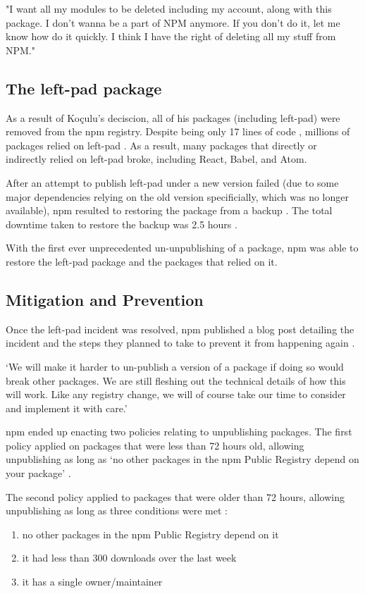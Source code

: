 \documentclass[acmsmall]{acmart}
\begin{document}
"I want all my modules to be deleted including my account, along with this package.
I don't wanna be a part of NPM anymore. If you don't do it, let me know how do it quickly.
I think I have the right of deleting all my stuff from NPM." \cite{medium-mikeroberts}

\subsection{The left-pad package}
As a result of Koçulu's deciscion, all of his packages (including left-pad) were removed
from the npm registry. Despite being only 17 lines of code \cite{github-leftpad-code},
millions of packages relied on left-pad \cite{github-leftpad-dependency}. As a result,
many packages that directly or indirectly relied on left-pad broke, including React,
Babel, and Atom.

After an attempt to publish left-pad under a new version failed (due to some major
dependencies relying on the old version specificially, which was no longer available),
npm resulted to restoring the package from a backup \cite{npmblog-leftpad}. The total
downtime taken to restore the backup was 2.5 hours \cite{npmblog-leftpad}.

With the first ever unprecedented un-unpublishing of a package, npm was able to restore
the left-pad package and the packages that relied on it.

\subsection{Mitigation and Prevention}
Once the left-pad incident was resolved, npm published a blog post detailing the
incident and the steps they planned to take to prevent it from happening again \cite{npmblog-leftpad}.

`We will make it harder to un-publish a version of a package if doing so would break other packages.
We are still fleshing out the technical details of how this will work. Like any registry change,
we will of course take our time to consider and implement it with care.' \cite{npmblog-leftpad}

npm ended up enacting two policies relating to unpublishing packages. The first policy applied on
packages that were less than 72 hours old, allowing unpublishing as long as `no other packages
in the npm Public Registry depend on your package' \cite{npm-docs-unpublishing}.

The second policy applied to packages that were older than 72 hours, allowing unpublishing as long
as three conditions were met \cite{npm-docs-unpublishing}:
\begin{enumerate}
  \item no other packages in the npm Public Registry depend on it
  \item it had less than 300 downloads over the last week
  \item it has a single owner/maintainer
\end{enumerate}
\end{document}
